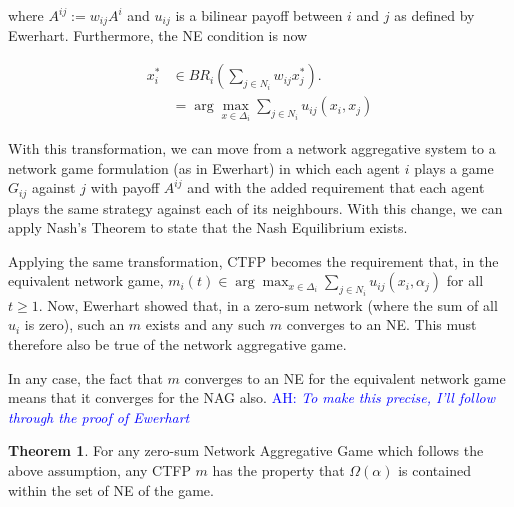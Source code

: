 \documentclass{article}
\theoremstyle{definition}
\newtheorem{theorem}{Theorem}
\newcommand{\ah}[1]{\textcolor{blue}{AH: \textit{#1}}}
\begin{document}
	where $A^{ij} := w_{ij} A^i$ and $u_{ij}$ is a bilinear payoff between $i$ and $j$ as defined by Ewerhart. Furthermore, the NE condition is now
	
	\begin{align}
			x_i^* & \in BR_i(\sum_{j \in N_i} w_{ij} x_j^*). \\
			& = \arg \max_{x \in \Delta_i} \sum_{j \in N_i} u_{ij}(x_i, x_j) 
	\end{align}
	
	 With this transformation, we can move from a network aggregative system to a network game formulation (as in Ewerhart) in which each agent $i$ plays a game $G_{ij}$ against $j$ with payoff $A^{ij}$ and with the added requirement that each agent plays the same strategy against each of its neighbours. With this change, we can apply Nash's Theorem to state that the Nash Equilibrium exists.
	
	Applying the same transformation, CTFP becomes the requirement that, in the equivalent network game, $m_i(t) \in \arg \max_{x \in \Delta_i} \sum_{j \in N_i} u_{ij}(x_i, \alpha_j)$ for all $t \geq 1$. Now, Ewerhart showed that, in a zero-sum network (where the sum of all $u_i$ is zero), such an $m$ exists and any such $m$ converges to an NE. This must therefore also be true of the network aggregative game.
	
	In any case, the fact that $m$ converges to an NE for the equivalent network game means that it converges for the NAG also. \ah{To make this precise, I'll follow through the proof of Ewerhart}
	
	\begin{theorem}
		For any zero-sum Network Aggregative Game which follows the above assumption, any CTFP $m$ has the property that $\Omega(\alpha)$ is contained within the set of NE of the game.
	\end{theorem}
	
\end{document}
